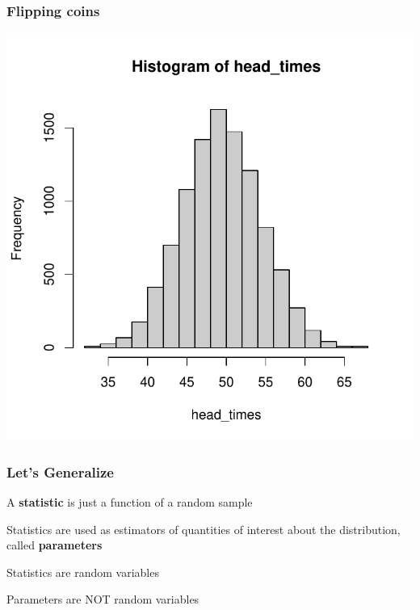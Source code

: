 \documentclass[12pt]{beamer}\usepackage[]{graphicx}\usepackage[]{color}
\newenvironment{knitrout}{}{} %
\begin{document}
\begin{frame}[fragile]
\frametitle{Flipping coins}

\begin{knitrout}\footnotesize
{}\color{fgcolor}

{\centering \includegraphics[width=.7\linewidth,height=.7\linewidth]{figure/unnamed-chunk-20-1} 

}



\end{knitrout}

\end{frame}


\begin{frame}
\begin{center}
\Huge{}
\end{center}
\end{frame}


\begin{frame}
\frametitle{Let's Generalize}

\bbi
  \item A \textbf{statistic} is just a function of a random sample
  \item Statistics are used as estimators of quantities of interest about the distribution, called \textbf{parameters}
  \item Statistics are random variables
  \item Parameters are NOT random variables
\ei

\end{frame}
\end{document}
